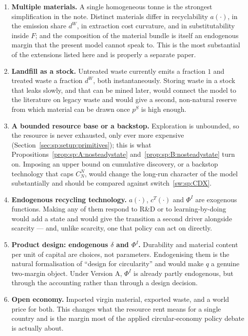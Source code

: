 \begin{enumerate}[label=\textbf{E\arabic*.},ref=E\arabic*,leftmargin=2.6em,itemsep=0.35em]
\item\label{ext:sp:multi} \textbf{Multiple materials.} A single homogeneous tonne is the strongest
simplification in the note. Distinct materials differ in recyclability $a(\cdot)$, in the emission
share $d^W$, in extraction cost curvature, and in substitutability inside $F$; and the composition of
the material bundle is itself an endogenous margin that the present model cannot speak to. This is the
most substantial of the extensions listed here and is properly a separate paper.

\item\label{ext:sp:landfill} \textbf{Landfill as a stock.} Untreated waste currently emits a fraction
$1$ and treated waste a fraction $d^W$, both instantaneously. Storing waste in a stock that leaks
slowly, and that can be mined later, would connect the model to the literature on legacy waste and
would give a second, non-natural reserve from which material can be drawn once $p^S$ is high enough.

\item\label{ext:sp:Aackstop} \textbf{A bounded resource base or a backstop.} Exploration is
unbounded, so the resource is never exhausted, only ever more expensive
(Section~\ref{sec:sp:setup:primitives}); this is what
Propositions~\ref{prop:sp:A:nosteadystate} and~\ref{prop:sp:B:nosteadystate} turn on. Imposing an upper bound on cumulative discovery, or
a backstop technology that caps $C^N_N$, would change the long-run character of the model
substantially and should be compared against switch~\ref{sw:sp:CDX}.

\item\label{ext:sp:tech} \textbf{Endogenous recycling technology.} $a(\cdot)$, $c^T(\cdot)$ and
$\Phi^I$ are exogenous functions. Making any of them respond to R\&D or to learning-by-doing would add
a state and would give the transition a second driver alongside scarcity --- and, unlike scarcity, one
that policy can act on directly.

\item\label{ext:sp:design} \textbf{Product design: endogenous $\delta$ and $\Phi^I$.} Durability and
material content per unit of capital are choices, not parameters. Endogenising them is the natural
formalisation of ``design for circularity'' and would make $q$ a genuine two-margin object. Under
Version A, $\Phi^I$ is already partly endogenous, but through the accounting rather than through a
design decision.

\item\label{ext:sp:open} \textbf{Open economy.} Imported virgin material, exported waste, and a world
price for both. This changes what the resource rent means for a single country and is the margin most
of the applied circular-economy policy debate is actually about.


\end{enumerate}
